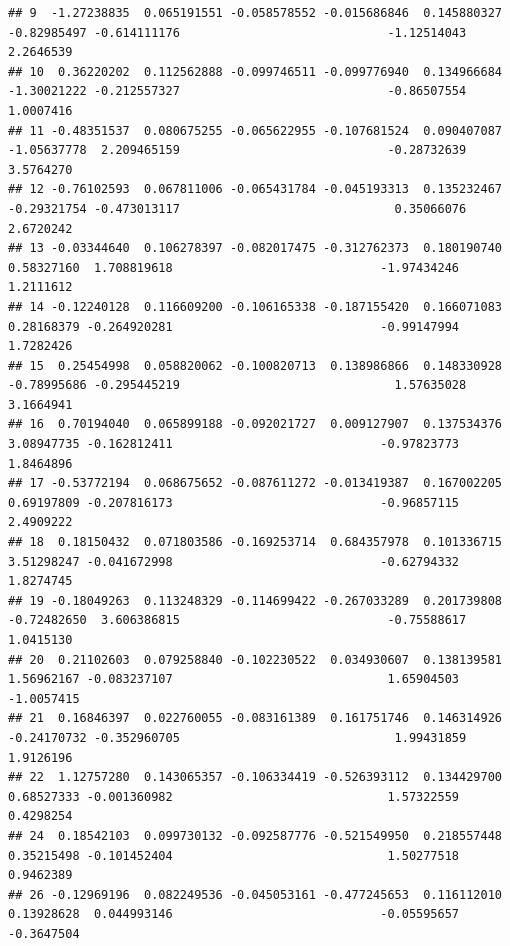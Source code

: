 \documentclass[
]{article}
\begin{document}
\begin{verbatim}
## 9  -1.27238835  0.065191551 -0.058578552 -0.015686846  0.145880327                    -0.82985497 -0.614111176                             -1.12514043      2.2646539
## 10  0.36220202  0.112562888 -0.099746511 -0.099776940  0.134966684                    -1.30021222 -0.212557327                             -0.86507554      1.0007416
## 11 -0.48351537  0.080675255 -0.065622955 -0.107681524  0.090407087                    -1.05637778  2.209465159                             -0.28732639      3.5764270
## 12 -0.76102593  0.067811006 -0.065431784 -0.045193313  0.135232467                    -0.29321754 -0.473013117                              0.35066076      2.6720242
## 13 -0.03344640  0.106278397 -0.082017475 -0.312762373  0.180190740                     0.58327160  1.708819618                             -1.97434246      1.2111612
## 14 -0.12240128  0.116609200 -0.106165338 -0.187155420  0.166071083                     0.28168379 -0.264920281                             -0.99147994      1.7282426
## 15  0.25454998  0.058820062 -0.100820713  0.138986866  0.148330928                    -0.78995686 -0.295445219                              1.57635028      3.1664941
## 16  0.70194040  0.065899188 -0.092021727  0.009127907  0.137534376                     3.08947735 -0.162812411                             -0.97823773      1.8464896
## 17 -0.53772194  0.068675652 -0.087611272 -0.013419387  0.167002205                     0.69197809 -0.207816173                             -0.96857115      2.4909222
## 18  0.18150432  0.071803586 -0.169253714  0.684357978  0.101336715                     3.51298247 -0.041672998                             -0.62794332      1.8274745
## 19 -0.18049263  0.113248329 -0.114699422 -0.267033289  0.201739808                    -0.72482650  3.606386815                             -0.75588617      1.0415130
## 20  0.21102603  0.079258840 -0.102230522  0.034930607  0.138139581                     1.56962167 -0.083237107                              1.65904503     -1.0057415
## 21  0.16846397  0.022760055 -0.083161389  0.161751746  0.146314926                    -0.24170732 -0.352960705                              1.99431859      1.9126196
## 22  1.12757280  0.143065357 -0.106334419 -0.526393112  0.134429700                     0.68527333 -0.001360982                              1.57322559      0.4298254
## 24  0.18542103  0.099730132 -0.092587776 -0.521549950  0.218557448                     0.35215498 -0.101452404                              1.50277518      0.9462389
## 26 -0.12969196  0.082249536 -0.045053161 -0.477245653  0.116112010                     0.13928628  0.044993146                             -0.05595657     -0.3647504

\end{verbatim}
\end{document}
